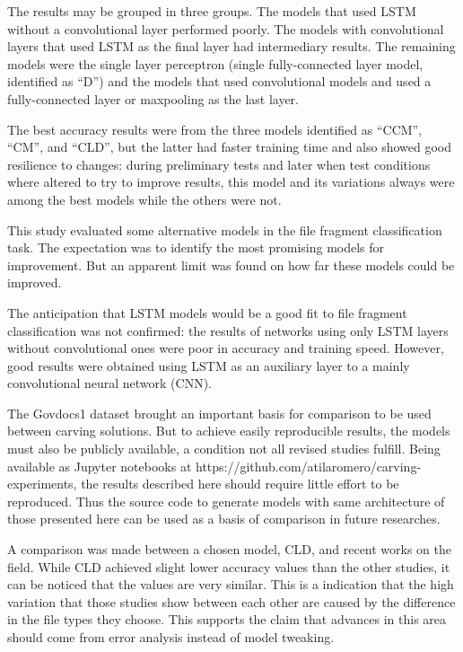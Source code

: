 The results may be grouped in three groups. The models that used LSTM without a convolutional layer performed poorly. The models with convolutional layers that used LSTM as the final layer had intermediary results. The remaining models were the single layer perceptron (single fully-connected layer model, identified as ``D'') and the models that used convolutional models and used a fully-connected layer or maxpooling as the last layer.

The best accuracy results were from the three models identified as ``CCM'', ``CM'', and ``CLD'', but the latter had faster training time and also showed good resilience to changes: during preliminary tests and later when test conditions where altered to try to improve results, this model and its variations always were among the best models while the others were not.

This study evaluated some alternative models in the file fragment classification task. The expectation was to identify the most promising models for improvement. But an apparent limit was found on how far these models could be improved. 

The anticipation that LSTM models would be a good fit to file fragment classification was not confirmed: the results of networks using only LSTM layers without convolutional ones were poor in accuracy and training speed. However, good results were obtained using LSTM as an auxiliary layer to a mainly convolutional neural network (CNN). 

The Govdocs1 dataset brought an important basis for comparison to be used between carving solutions. But to achieve easily reproducible results, the models must also be publicly available, a condition not all revised studies fulfill. Being available as Jupyter notebooks at https://github.com/atilaromero/carving-experiments, the results described here should require little effort to be reproduced. Thus the source code to generate models with same architecture of those presented here can be used as a basis of comparison in future researches.

A comparison was made between a chosen model, CLD, and recent works on the field. While CLD achieved slight lower accuracy values than the other studies, it can be noticed that the values are very similar. This is a indication that the high  variation that those studies show between each other are caused by the difference in the file types they choose. This supports the claim that advances in this area should come from error analysis instead of model tweaking.

